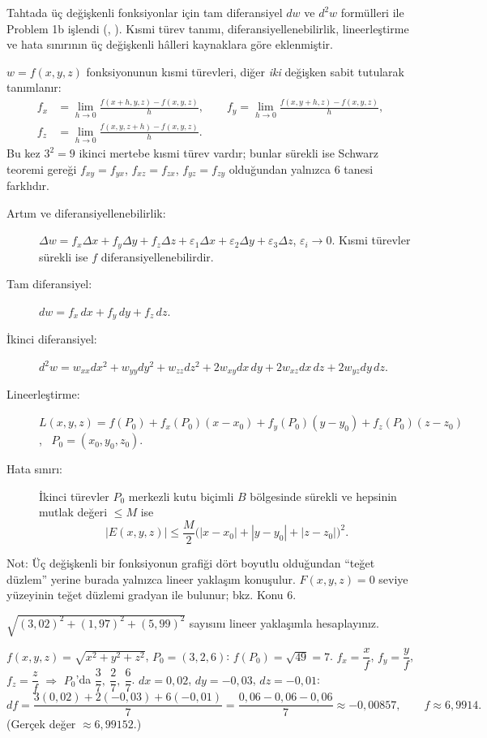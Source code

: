 \begin{bilgi}
Tahtada üç değişkenli fonksiyonlar için tam diferansiyel $dw$ ve $d^2w$ formülleri ile Problem 1b işlendi
(, ). Kısmi türev tanımı, diferansiyellenebilirlik, lineerleştirme ve
hata sınırının üç değişkenli hâlleri kaynaklara göre eklenmiştir.
\end{bilgi}

$w=f(x,y,z)$ fonksiyonunun kısmi türevleri, diğer \emph{iki} değişken sabit tutularak tanımlanır:
\begin{align*}
f_x&=\lim_{h\to0}\frac{f(x+h,y,z)-f(x,y,z)}{h},\qquad
f_y=\lim_{h\to0}\frac{f(x,y+h,z)-f(x,y,z)}{h},\\
f_z&=\lim_{h\to0}\frac{f(x,y,z+h)-f(x,y,z)}{h}.
\end{align*}
Bu kez $3^2=9$ ikinci mertebe kısmi türev vardır; bunlar sürekli ise Schwarz teoremi gereği
$f_{xy}=f_{yx}$, $f_{xz}=f_{zx}$, $f_{yz}=f_{zy}$ olduğundan yalnızca $6$ tanesi farklıdır.

\begin{teorem}
\begin{description}
  \item[Artım ve diferansiyellenebilirlik:]
  $\Delta w=f_x\Delta x+f_y\Delta y+f_z\Delta z+\varepsilon_1\Delta x+\varepsilon_2\Delta y+\varepsilon_3\Delta z$,
  $\varepsilon_i\to0$. Kısmi türevler sürekli ise $f$ diferansiyellenebilirdir.
  \item[Tam diferansiyel:] $dw=f_x\,dx+f_y\,dy+f_z\,dz$.
  \item[İkinci diferansiyel:] $d^2w=w_{xx}dx^2+w_{yy}dy^2+w_{zz}dz^2+2w_{xy}dx\,dy+2w_{xz}dx\,dz+2w_{yz}dy\,dz$.
  \item[Lineerleştirme:]
  $L(x,y,z)=f(P_0)+f_x(P_0)(x-x_0)+f_y(P_0)(y-y_0)+f_z(P_0)(z-z_0)$, \ $P_0=(x_0,y_0,z_0)$.
  \item[Hata sınırı:] İkinci türevler $P_0$ merkezli kutu biçimli $B$ bölgesinde sürekli ve hepsinin mutlak değeri
  $\le M$ ise
  \[ |E(x,y,z)|\le\frac M2\big(|x-x_0|+|y-y_0|+|z-z_0|\big)^2 . \]
\end{description}
\end{teorem}

Not: Üç değişkenli bir fonksiyonun grafiği dört boyutlu olduğundan ``teğet düzlem'' yerine burada yalnızca lineer yaklaşım
konuşulur. $F(x,y,z)=0$ seviye yüzeyinin teğet düzlemi gradyan ile bulunur; bkz. Konu 6.

\begin{soru}
$\sqrt{(3{,}02)^2+(1{,}97)^2+(5{,}99)^2}$ sayısını lineer yaklaşımla hesaplayınız.
\end{soru}
\begin{cevap}
$f(x,y,z)=\sqrt{x^2+y^2+z^2}$, $P_0=(3,2,6)$: $f(P_0)=\sqrt{49}=7$.
$f_x=\dfrac xf$, $f_y=\dfrac yf$, $f_z=\dfrac zf$ $\Rightarrow$ $P_0$'da $\dfrac37,\ \dfrac27,\ \dfrac67$.
$dx=0{,}02$, $dy=-0{,}03$, $dz=-0{,}01$:
\[
df=\frac{3(0{,}02)+2(-0{,}03)+6(-0{,}01)}{7}=\frac{0{,}06-0{,}06-0{,}06}{7}\approx-0{,}00857,\qquad f\approx6{,}9914 .
\]
(Gerçek değer $\approx6{,}99152$.)
\end{cevap}

